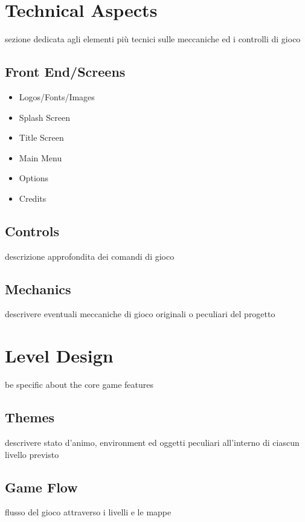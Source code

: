 \documentclass[a4paper]{scrreprt}
\begin{document}
\chapter{Technical Aspects}
sezione dedicata agli elementi più tecnici sulle meccaniche ed i controlli di gioco

\section{Front End/Screens}

\begin{itemize}
\item Logos/Fonts/Images
\item Splash Screen
\item Title Screen
\item Main Menu
\item Options
\item Credits
\end{itemize}

\section{Controls}
descrizione approfondita dei comandi di gioco

\section{Mechanics}
descrivere eventuali meccaniche di gioco originali o peculiari del progetto


\chapter{Level Design}
be specific about the core game features 

\section{Themes}
descrivere stato d'animo, environment ed oggetti peculiari all'interno di ciascun livello previsto

\section{Game Flow}
flusso del gioco attraverso i livelli e le mappe

\end{document}
